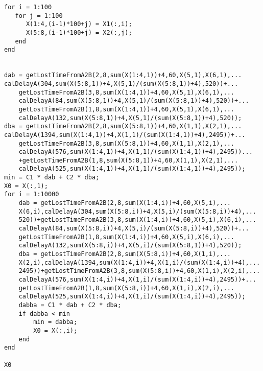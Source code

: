 \documentclass[a4paper,12pt]{article}
\begin{document}
\begin{CJK*}{UTF8}{gbsn}
\begin{lstlisting}
for i = 1:100
   for j = 1:100
      X(1:4,(i-1)*100+j) = X1(:,i);
      X(5:8,(i-1)*100+j) = X2(:,j);
   end
end


dab = getLostTimeFromA2B(2,8,sum(X(1:4,1))+4,60,X(5,1),X(6,1),...
calDelayA(304,sum(X(5:8,1))+4,X(5,1)/(sum(X(5:8,1))+4),520))+...
    getLostTimeFromA2B(3,8,sum(X(1:4,1))+4,60,X(5,1),X(6,1),...
    calDelayA(84,sum(X(5:8,1))+4,X(5,1)/(sum(X(5:8,1))+4),520))+...
    getLostTimeFromA2B(1,8,sum(X(1:4,1))+4,60,X(5,1),X(6,1),...
    calDelayA(132,sum(X(5:8,1))+4,X(5,1)/(sum(X(5:8,1))+4),520));
dba = getLostTimeFromA2B(2,8,sum(X(5:8,1))+4,60,X(1,1),X(2,1),...
calDelayA(1394,sum(X(1:4,1))+4,X(1,1)/(sum(X(1:4,1))+4),2495))+...
    getLostTimeFromA2B(3,8,sum(X(5:8,1))+4,60,X(1,1),X(2,1),...
    calDelayA(576,sum(X(1:4,1))+4,X(1,1)/(sum(X(1:4,1))+4),2495))...
    +getLostTimeFromA2B(1,8,sum(X(5:8,1))+4,60,X(1,1),X(2,1),...
    calDelayA(525,sum(X(1:4,1))+4,X(1,1)/(sum(X(1:4,1))+4),2495));
min = C1 * dab + C2 * dba;
X0 = X(:,1);
for i = 1:10000
    dab = getLostTimeFromA2B(2,8,sum(X(1:4,i))+4,60,X(5,i),...
    X(6,i),calDelayA(304,sum(X(5:8,i))+4,X(5,i)/(sum(X(5:8,i))+4),...
    520))+getLostTimeFromA2B(3,8,sum(X(1:4,i))+4,60,X(5,i),X(6,i),...
    calDelayA(84,sum(X(5:8,i))+4,X(5,i)/(sum(X(5:8,i))+4),520))+...
    getLostTimeFromA2B(1,8,sum(X(1:4,i))+4,60,X(5,i),X(6,i),...
    calDelayA(132,sum(X(5:8,i))+4,X(5,i)/(sum(X(5:8,1))+4),520));
    dba = getLostTimeFromA2B(2,8,sum(X(5:8,i))+4,60,X(1,i),...
    X(2,i),calDelayA(1394,sum(X(1:4,i))+4,X(1,i)/(sum(X(1:4,i))+4),...
    2495))+getLostTimeFromA2B(3,8,sum(X(5:8,i))+4,60,X(1,i),X(2,i),...
    calDelayA(576,sum(X(1:4,i))+4,X(1,i)/(sum(X(1:4,i))+4),2495))+...
    getLostTimeFromA2B(1,8,sum(X(5:8,i))+4,60,X(1,i),X(2,i),...
    calDelayA(525,sum(X(1:4,i))+4,X(1,i)/(sum(X(1:4,i))+4),2495));
    dabba = C1 * dab + C2 * dba;
    if dabba < min
        min = dabba;
        X0 = X(:,i);
    end
end

X0
\end{lstlisting} 


    
\end{CJK*}
\end{document}
